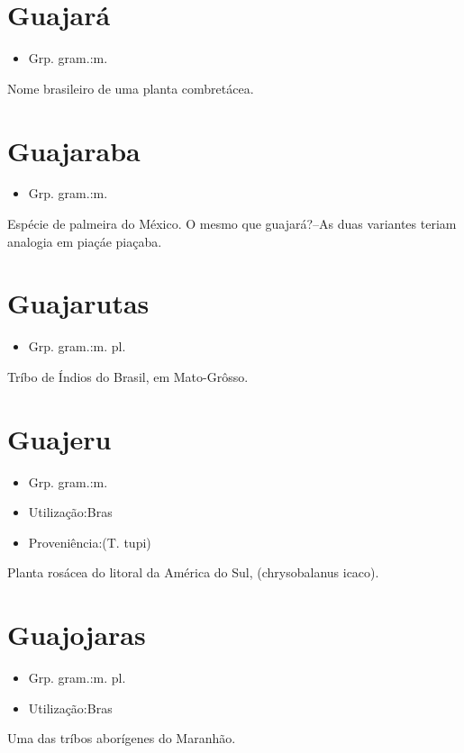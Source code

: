 \section{Guajará}
\begin{itemize}
\item {Grp. gram.:m.}
\end{itemize}
Nome brasileiro de uma planta combretácea.
\section{Guajaraba}
\begin{itemize}
\item {Grp. gram.:m.}
\end{itemize}
Espécie de palmeira do México.
O mesmo que \textunderscore guajará\textunderscore ?--As duas variantes teriam analogia em \textunderscore piaçá\textunderscore  e \textunderscore piaçaba\textunderscore .
\section{Guajarutas}
\begin{itemize}
\item {Grp. gram.:m. pl.}
\end{itemize}
Tríbo de Índios do Brasil, em Mato-Grôsso.
\section{Guajeru}
\begin{itemize}
\item {Grp. gram.:m.}
\end{itemize}
\begin{itemize}
\item {Utilização:Bras}
\end{itemize}
\begin{itemize}
\item {Proveniência:(T. tupi)}
\end{itemize}
Planta rosácea do litoral da América do Sul, (\textunderscore chrysobalanus icaco\textunderscore ).
\section{Guajojaras}
\begin{itemize}
\item {Grp. gram.:m. pl.}
\end{itemize}
\begin{itemize}
\item {Utilização:Bras}
\end{itemize}
Uma das tríbos aborígenes do Maranhão.
